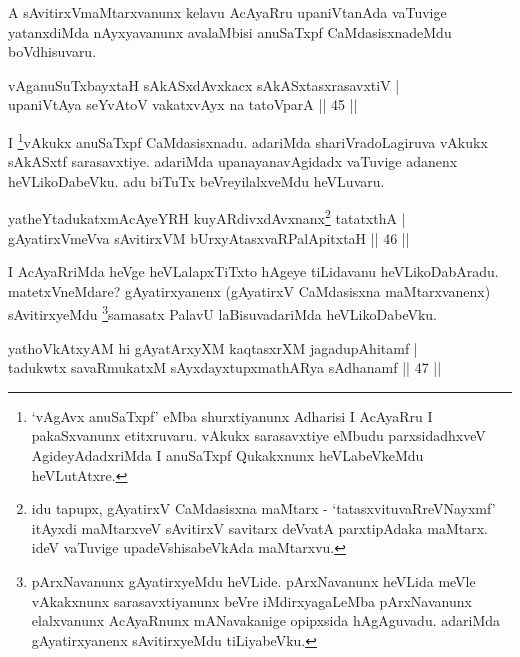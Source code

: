 \begin{artha} 
A sAvitirxVmaMtarxvanunx kelavu AcAyaRru upaniVtanAda vaTuvige 
yatanxdiMda nAyxyavanunx avalaMbisi anuSaTxpf CaMdasisxnadeMdu 
boVdhisuvaru.
\end{artha}


\begin{shl}
vAganuSuTxbayxtaH sAkASxdAvxkacx sAkASxtasxrasavxtiV | \\
upaniVtAya seYvAtoV vakatxvAyx na tatoV\s parA \hfill ||  45 || 
\end{shl}

\begin{artha} 
I \footnote{`vAgAvx anuSaTxpf' eMba shurxtiyanunx Adharisi I 
AcAyaRru I pakaSxvanunx etitxruvaru. vAkukx sarasavxtiye eMbudu 
parxsidadhxveV AgideyAdadxriMda I anuSaTxpf Qukakxnunx heVLabeVkeMdu 
heVLutAtxre.}vAkukx anuSaTxpf CaMdasisxnadu. adariMda 
shariVradoLagiruva vAkukx sAkASxtf sarasavxtiye. adariMda 
upanayanavAgidadx vaTuvige adanenx heVLikoDabeVku. adu biTuTx 
beVreyilalxveMdu heVLuvaru.
\end{artha}


\begin{shl}
yatheYtadukatxmAcAyeYRH kuyARdivxdAvxnanx\footnote{idu tapupx, gAyatirxV CaMdasisxna maMtarx - 
`tatasxvituvaRreVNayxmf' itAyxdi maMtarxveV sAvitirxV savitarx deVvatA 
parxtipAdaka maMtarx. ideV vaTuvige upadeVshisabeVkAda maMtarxvu.} tatatxthA | \\
gAyatirxVmeVva sAvitirxVM bUrxyAtasxvaRPalApitxtaH \hfill ||  46 || 
\end{shl}

\begin{artha} 
I AcAyaRriMda heVge heVLalapxTiTxto hAgeye tiLidavanu heVLikoDabAradu. 
matetxVneMdare? gAyatirxyanenx (gAyatirxV CaMdasisxna maMtarxvanenx) 
sAvitirxyeMdu \footnote{pArxNavanunx gAyatirxyeMdu heVLide. 
pArxNavanunx heVLida meVle vAkakxnunx sarasavxtiyanunx beVre 
iMdirxyagaLeMba pArxNavanunx elalxvanunx AcAyaRnunx mANavakanige 
opipxsida hAgAguvadu. adariMda gAyatirxyanenx sAvitirxyeMdu 
tiLiyabeVku.}samasatx PalavU laBisuvadariMda 
heVLikoDabeVku.
\end{artha}


\begin{shl}
yathoVkAtxyAM hi gAyatArxyXM kaqtasxrXM jagadupAhitamf | \\
tadukwtx savaRmukatxM sAyxdayxtupxmathARya sAdhanamf \hfill ||  47 || 
\end{shl}

